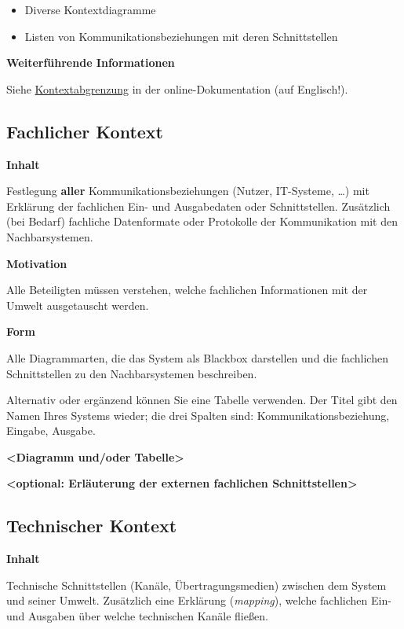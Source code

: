 \documentclass[a4paper,12pt]{article}
\begin{document}
\begin{itemize}
\item
  Diverse Kontextdiagramme
\item
  Listen von Kommunikationsbeziehungen mit deren Schnittstellen
\end{itemize}

\textbf{Weiterführende Informationen}

Siehe \href{https://docs.arc42.org/section-3/}{Kontextabgrenzung} in der
online-Dokumentation (auf Englisch!).

\subsection{Fachlicher Kontext}\label{_fachlicher_kontext}

\textbf{Inhalt}

Festlegung \textbf{aller} Kommunikationsbeziehungen (Nutzer, IT-Systeme,
\ldots\hspace{0pt}) mit Erklärung der fachlichen Ein- und Ausgabedaten
oder Schnittstellen. Zusätzlich (bei Bedarf) fachliche Datenformate oder
Protokolle der Kommunikation mit den Nachbarsystemen.

\textbf{Motivation}

Alle Beteiligten müssen verstehen, welche fachlichen Informationen mit
der Umwelt ausgetauscht werden.

\textbf{Form}

Alle Diagrammarten, die das System als Blackbox darstellen und die
fachlichen Schnittstellen zu den Nachbarsystemen beschreiben.

Alternativ oder ergänzend können Sie eine Tabelle verwenden. Der Titel
gibt den Namen Ihres Systems wieder; die drei Spalten sind:
Kommunikationsbeziehung, Eingabe, Ausgabe.

\textbf{\textless Diagramm und/oder Tabelle\textgreater{}}

\textbf{\textless optional: Erläuterung der externen fachlichen
Schnittstellen\textgreater{}}

\subsection{Technischer Kontext}\label{_technischer_kontext}

\textbf{Inhalt}

Technische Schnittstellen (Kanäle, Übertragungsmedien) zwischen dem
System und seiner Umwelt. Zusätzlich eine Erklärung (\emph{mapping}),
welche fachlichen Ein- und Ausgaben über welche technischen Kanäle
fließen.
\end{document}
